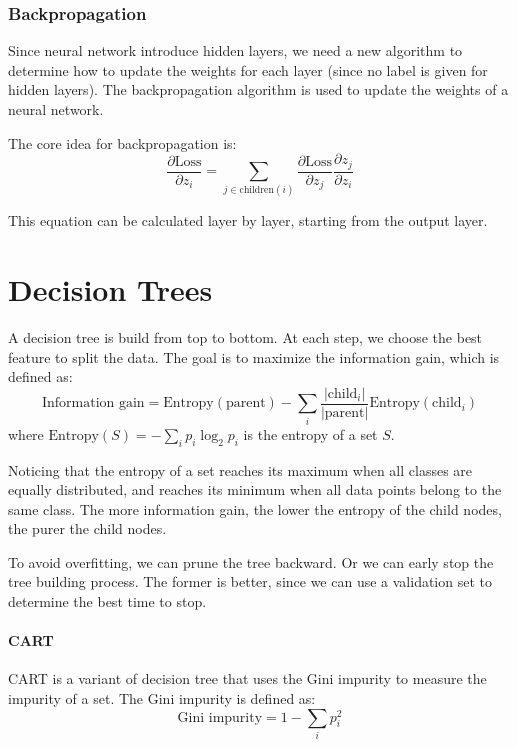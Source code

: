\documentclass[a4paper,12pt]{article}
\begin{document}
\subsubsection{Backpropagation}

Since neural network introduce hidden layers, we need a new algorithm to determine how to update the weights for each layer (since no label is given for hidden layers). The backpropagation algorithm is used to update the weights of a neural network.

The core idea for backpropagation is:
\begin{equation*}
  \frac{\partial \text{Loss}}{\partial z_i} = \sum_{j \in \text{children}(i)} \frac{\partial \text{Loss}}{\partial z_j} \frac{\partial z_j}{\partial z_i}
\end{equation*}

This equation can be calculated layer by layer, starting from the output layer.

\section{Decision Trees}

A decision tree is build from top to bottom. At each step, we choose the best feature to split the data. The goal is to maximize the information gain, which is defined as:
\begin{equation*}
  \text{Information gain} = \text{Entropy}(\text{parent}) - \sum_{i} \frac{|\text{child}_i|}{|\text{parent}|} \text{Entropy}(\text{child}_i)
\end{equation*}
where $\text{Entropy}(S) = -\sum_{i} p_i \log_2 p_i$ is the entropy of a set $S$.

Noticing that the entropy of a set reaches its maximum when all classes are equally distributed, and reaches its minimum when all data points belong to the same class. The more information gain, the lower the entropy of the child nodes, the purer the child nodes.

To avoid overfitting, we can prune the tree backward. Or we can early stop the tree building process. The former is better, since we can use a validation set to determine the best time to stop.

\paragraph{CART} CART is a variant of decision tree that uses the Gini impurity to measure the impurity of a set. The Gini impurity is defined as:
\begin{equation*}
  \text{Gini impurity} = 1 - \sum_{i} p_i^2
\end{equation*}
\end{document}

